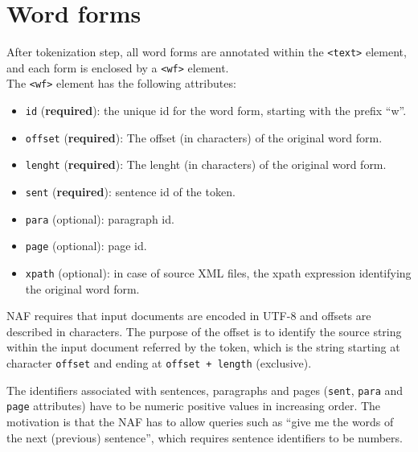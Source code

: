 
\section{Word forms}
\label{sec:word-forms}

After tokenization step, all word forms are annotated within the
\texttt{<text>} element, and each form is enclosed by a \texttt{<wf>}
element.\\

The \texttt{<wf>} element has the following attributes:
\begin{itemize}
\item \texttt{id} (\textbf{required}): the unique id for the word form,
  starting with the prefix ``w''.
\item \texttt{offset} (\textbf{required}): The offset (in characters) of the
  original word form.
\item \texttt{lenght} (\textbf{required}): The lenght (in characters) of the
  original word form.
\item \texttt{sent} (\textbf{required}): sentence id of the token.
\item \texttt{para} (optional): paragraph id.
\item \texttt{page} (optional): page id.
\item \texttt{xpath} (optional): in case of source XML files, the xpath
  expression identifying the original word form.
\end{itemize}

NAF requires that input documents are encoded in UTF-8 and offsets are
described in characters. The purpose of the offset is to identify the source
string within the input document referred by the token, which is the string
starting at character \texttt{offset} and ending at \texttt{offset + length}
(exclusive).

The identifiers associated with sentences, paragraphs and pages
(\texttt{sent}, \texttt{para} and \texttt{page} attributes) have to be
numeric positive values in increasing order. The motivation is that the NAF
has to allow queries such as ``give me the words of the next (previous)
sentence'', which requires sentence identifiers to be numbers.

